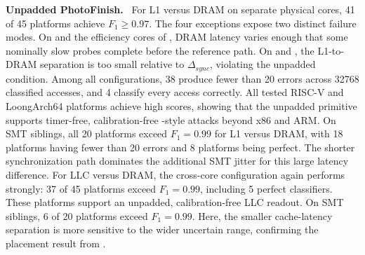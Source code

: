 \documentclass[letterpaper,twocolumn,10pt]{article} %
\newcommand{\paragrabf}[1]{\noindent \textbf{#1.}\ }
\newcommand{\AttackName}{PhotoFinish\xspace}
\newcommand{\rdelta}[1]{$\Delta_{#1}$}
\begin{document}
\paragrabf{Unpadded \AttackName}
For L1 versus DRAM on separate physical cores, \num{41} of \num{45} platforms achieve $F_1\geq0.97$.
The four exceptions expose two distinct failure modes.
On \labseventyoneCPU and the efficiency cores of \labninetyfiveCPU, DRAM latency varies enough that some nominally slow probes complete before the reference path.
On \labfourtyfourCPU and \labeightythreeCPU, the L1-to-DRAM separation is too small relative to \rdelta{sync}, violating the unpadded condition.
Among all configurations, \num{38} produce fewer than \num{20} errors across \num{32768} classified accesses, and \num{4} classify every access correctly.
All tested RISC-V and LoongArch64 platforms achieve high scores, showing that the unpadded primitive supports timer-free, calibration-free \FlushReload-style attacks beyond x86 and ARM.
On SMT siblings, all \num{20} platforms exceed $F_1=0.99$ for L1 versus DRAM, with \num{18} platforms having fewer than \num{20} errors and \num{8} platforms being perfect.
The shorter synchronization path dominates the additional SMT jitter for this large latency difference.
For LLC versus DRAM, the cross-core configuration again performs strongly: \num{37} of \num{45} platforms exceed $F_1=0.99$, including \num{5} perfect classifiers.
These platforms support an unpadded, calibration-free LLC \PrimeProbe readout.
On SMT siblings, \num{6} of \num{20} platforms exceed $F_1=0.99$.
Here, the smaller cache-latency separation is more sensitive to the wider uncertain range, confirming the placement result from .
\end{document}
